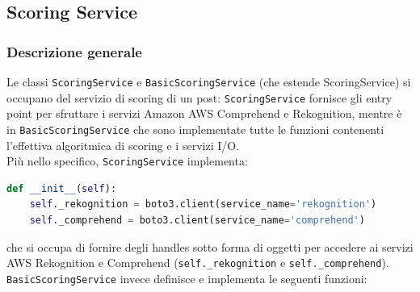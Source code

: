 \subsection{Scoring Service}
\subsubsection{Descrizione generale}
Le classi \verb+ScoringService+ e \verb+BasicScoringService+ (che estende ScoringService\verb++) si occupano
del servizio di scoring di un post: \verb+ScoringService+ fornisce gli entry point per sfruttare 
i servizi Amazon AWS Comprehend e Rekognition, mentre è in \verb+BasicScoringService+ che sono 
implementate tutte le funzioni contenenti l'effettiva algoritmica di scoring e i servizi I/O.\\
Più nello specifico, \verb+ScoringService+ implementa:
\begin{lstlisting}[language=Python]
def __init__(self):
    self._rekognition = boto3.client(service_name='rekognition')
    self._comprehend = boto3.client(service_name='comprehend')
\end{lstlisting}
che si occupa di fornire degli handles sotto forma di oggetti per accedere ai servizi AWS Rekognition
e Comprehend (\verb+self._rekognition+ e \verb+self._comprehend+).\\
\verb+BasicScoringService+ invece definisce e implementa le seguenti funzioni:

